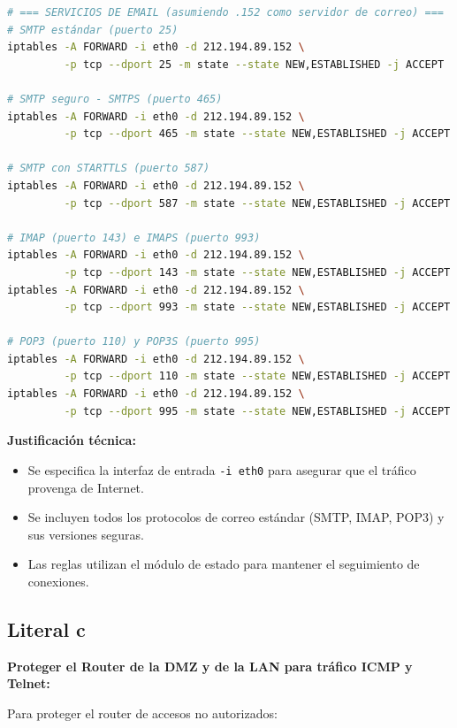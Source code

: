 {\begin{lstlisting}[language=bash, caption=Reglas para servicios públicos en DMZ]
# === SERVICIOS DE EMAIL (asumiendo .152 como servidor de correo) ===
# SMTP estándar (puerto 25)
iptables -A FORWARD -i eth0 -d 212.194.89.152 \
         -p tcp --dport 25 -m state --state NEW,ESTABLISHED -j ACCEPT

# SMTP seguro - SMTPS (puerto 465)
iptables -A FORWARD -i eth0 -d 212.194.89.152 \
         -p tcp --dport 465 -m state --state NEW,ESTABLISHED -j ACCEPT

# SMTP con STARTTLS (puerto 587)
iptables -A FORWARD -i eth0 -d 212.194.89.152 \
         -p tcp --dport 587 -m state --state NEW,ESTABLISHED -j ACCEPT

# IMAP (puerto 143) e IMAPS (puerto 993)
iptables -A FORWARD -i eth0 -d 212.194.89.152 \
         -p tcp --dport 143 -m state --state NEW,ESTABLISHED -j ACCEPT
iptables -A FORWARD -i eth0 -d 212.194.89.152 \
         -p tcp --dport 993 -m state --state NEW,ESTABLISHED -j ACCEPT

# POP3 (puerto 110) y POP3S (puerto 995)
iptables -A FORWARD -i eth0 -d 212.194.89.152 \
         -p tcp --dport 110 -m state --state NEW,ESTABLISHED -j ACCEPT
iptables -A FORWARD -i eth0 -d 212.194.89.152 \
         -p tcp --dport 995 -m state --state NEW,ESTABLISHED -j ACCEPT
\end{lstlisting}

\textbf{Justificación técnica:}
\begin{itemize}
    \item Se especifica la interfaz de entrada \texttt{-i eth0} para asegurar que el tráfico provenga de Internet.
    \item Se incluyen todos los protocolos de correo estándar (SMTP, IMAP, POP3) y sus versiones seguras.
    \item Las reglas utilizan el módulo de estado para mantener el seguimiento de conexiones.
\end{itemize}


\subsection{Literal c}
\textbf{Proteger el Router de la DMZ y de la LAN para tráfico ICMP y Telnet:}


Para proteger el router de accesos no autorizados:

}
